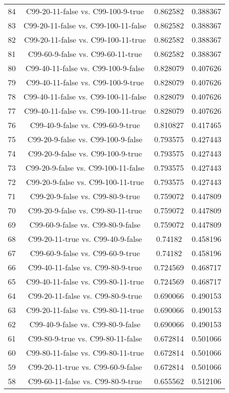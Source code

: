 \documentclass[a4paper,10pt]{article}
\begin{document}
\begin{landscape}
\begin{table}[!htp]
\begin{tabular}{cccc}
84&C99-20-11-false vs. C99-100-9-true&0.862582&0.388367\\
83&C99-20-11-false vs. C99-100-11-false&0.862582&0.388367\\
82&C99-20-11-false vs. C99-100-11-true&0.862582&0.388367\\
81&C99-60-9-false vs. C99-60-11-true&0.862582&0.388367\\
80&C99-40-11-false vs. C99-100-9-false&0.828079&0.407626\\
79&C99-40-11-false vs. C99-100-9-true&0.828079&0.407626\\
78&C99-40-11-false vs. C99-100-11-false&0.828079&0.407626\\
77&C99-40-11-false vs. C99-100-11-true&0.828079&0.407626\\
76&C99-40-9-false vs. C99-60-9-true&0.810827&0.417465\\
75&C99-20-9-false vs. C99-100-9-false&0.793575&0.427443\\
74&C99-20-9-false vs. C99-100-9-true&0.793575&0.427443\\
73&C99-20-9-false vs. C99-100-11-false&0.793575&0.427443\\
72&C99-20-9-false vs. C99-100-11-true&0.793575&0.427443\\
71&C99-20-9-false vs. C99-80-9-true&0.759072&0.447809\\
70&C99-20-9-false vs. C99-80-11-true&0.759072&0.447809\\
69&C99-60-9-false vs. C99-80-9-false&0.759072&0.447809\\
68&C99-20-11-true vs. C99-40-9-false&0.74182&0.458196\\
67&C99-60-9-false vs. C99-60-9-true&0.74182&0.458196\\
66&C99-40-11-false vs. C99-80-9-true&0.724569&0.468717\\
65&C99-40-11-false vs. C99-80-11-true&0.724569&0.468717\\
64&C99-20-11-false vs. C99-80-9-true&0.690066&0.490153\\
63&C99-20-11-false vs. C99-80-11-true&0.690066&0.490153\\
62&C99-40-9-false vs. C99-80-9-false&0.690066&0.490153\\
61&C99-80-9-true vs. C99-80-11-false&0.672814&0.501066\\
60&C99-80-11-false vs. C99-80-11-true&0.672814&0.501066\\
59&C99-20-11-true vs. C99-60-9-false&0.672814&0.501066\\
58&C99-60-11-false vs. C99-80-9-true&0.655562&0.512106\\

\end{tabular}
\end{table}
\end{landscape}
\end{document}
